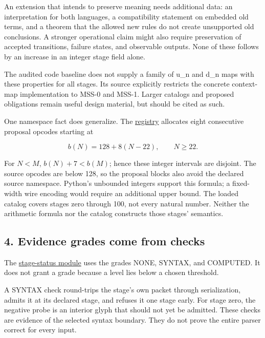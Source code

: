 \documentclass[
  11pt,
]{article}
\begin{document}
An extension that intends to preserve meaning needs additional data: an
interpretation for both languages, a compatibility statement on embedded
old terms, and a theorem that the allowed new rules do not create
unsupported old conclusions. A stronger operational claim might also
require preservation of accepted transitions, failure states, and
observable outputs. None of these follows by an increase in an integer
stage field alone.

The audited code baseline does not supply a family of u\_n and d\_n maps
with these properties for all stages. Its source explicitly restricts
the concrete context-map implementation to MSS-0 and MSS-1. Larger
catalogs and proposed obligations remain useful design material, but
should be cited as such.

One namespace fact does generalize. The
\href{https://github.com/dbccpage/the_symbol_game/blob/52cb5457f6c485ba548cfd292f6012a941ed22cf/research/mssn_sn_tower/code/python/registry.py}{registry}
allocates eight consecutive proposal opcodes starting at

\[
b(N)=128+8(N-22),\qquad N\geq22.
\]

For \(N<M\), \(b(N)+7<b(M)\); hence these integer intervals are
disjoint. The source opcodes are below 128, so the proposal blocks also
avoid the declared source namespace. Python's unbounded integers support
this formula; a fixed-width wire encoding would require an additional
upper bound. The loaded catalog covers stages zero through 100, not
every natural number. Neither the arithmetic formula nor the catalog
constructs those stages' semantics.

\hypertarget{evidence-grades-come-from-checks}{%
\subsection{4. Evidence grades come from
checks}\label{evidence-grades-come-from-checks}}

The
\href{https://github.com/dbccpage/the_symbol_game/blob/52cb5457f6c485ba548cfd292f6012a941ed22cf/research/mssn_sn_tower/code/python/stage_status.py}{stage-status
module} uses the grades NONE, SYNTAX, and COMPUTED. It does not grant a
grade because a level lies below a chosen threshold.

A SYNTAX check round-trips the stage's own packet through serialization,
admits it at its declared stage, and refuses it one stage early. For
stage zero, the negative probe is an interior glyph that should not yet
be admitted. These checks are evidence of the selected syntax boundary.
They do not prove the entire parser correct for every input.
\end{document}
